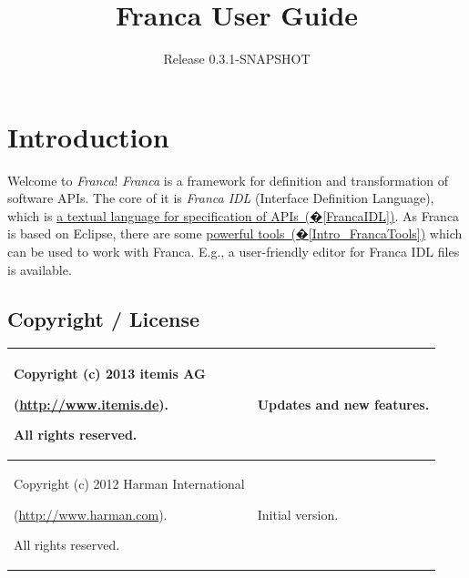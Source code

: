 \documentclass[a4paper,10pt]{scrreprt}
\author{Release 0.3.1-SNAPSHOT}
\title{Franca User Guide}
\newlength{\XdocTEffectiveWidth}
\begin{document}
\maketitle
\tableofcontents

\chapter{Introduction}
\label{Introduction}
Welcome to \textit{Franca}! \textit{Franca} is a framework for definition and transformation of
software APIs. The core of it is \textit{Franca IDL} (Interface Definition Language),
which is \hyperref[FrancaIDL]{a textual language for specification of APIs~(�\ref*{FrancaIDL})}.
As Franca is based on Eclipse, there are some \hyperref[Intro_FrancaTools]{powerful tools~(�\ref*{Intro_FrancaTools})}
which can be used to work with Franca. E.g., a user-friendly editor for
Franca IDL files is available.

\section{Copyright / License}
\label{Intro_FrancaLicense}

\setlength{\XdocTEffectiveWidth}{\textwidth}
\addtolength{\XdocTEffectiveWidth}{-4.0\tabcolsep}
\noindent\begin{tabular}{p{0.67\XdocTEffectiveWidth}p{0.33\XdocTEffectiveWidth}}
\toprule
Copyright (c) 2013 itemis AG
		
			(\href{http://www.itemis.de}{http://www.itemis.de}).
			
			All rights reserved.

 & Updates and new features.

\\
\midrule
Copyright (c) 2012 Harman International
		
			(\href{http://www.harman.com}{http://www.harman.com}).
			
			All rights reserved.

 & Initial version.

\\
\bottomrule
\end{tabular}
\end{document}
